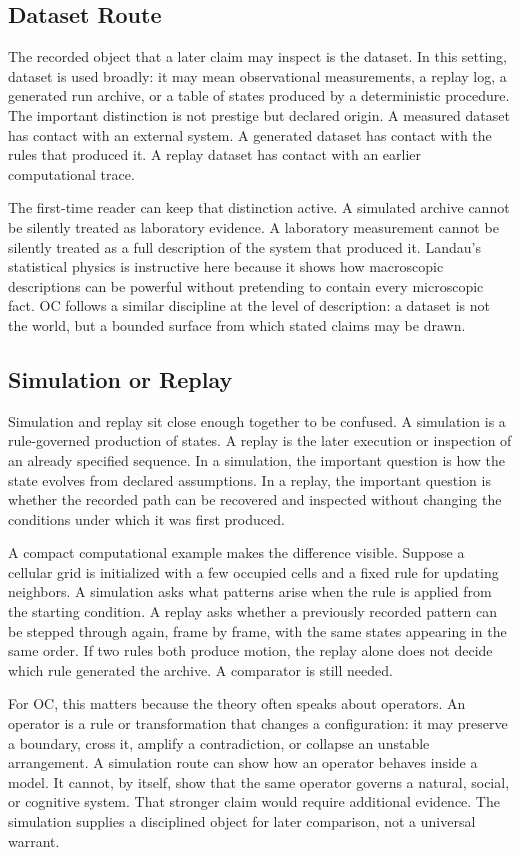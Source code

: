\documentclass[11pt,a4paper,openany]{book}
\begin{document}
\subsection{Dataset Route}
The recorded object that a later claim may inspect is the dataset. In this setting, dataset is used broadly: it may mean observational measurements, a replay log, a generated run archive, or a table of states produced by a deterministic procedure. The important distinction is not prestige but declared origin. A measured dataset has contact with an external system. A generated dataset has contact with the rules that produced it. A replay dataset has contact with an earlier computational trace. \cite{wilson_renormalization,landau_stat_physics}\par
The first-time reader can keep that distinction active. A simulated archive cannot be silently treated as laboratory evidence. A laboratory measurement cannot be silently treated as a full description of the system that produced it. Landau's statistical physics is instructive here because it shows how macroscopic descriptions can be powerful without pretending to contain every microscopic fact. OC follows a similar discipline at the level of description: a dataset is not the world, but a bounded surface from which stated claims may be drawn.\par
\subsection{Simulation or Replay}
Simulation and replay sit close enough together to be confused. A simulation is a rule-governed production of states. A replay is the later execution or inspection of an already specified sequence. In a simulation, the important question is how the state evolves from declared assumptions. In a replay, the important question is whether the recorded path can be recovered and inspected without changing the conditions under which it was first produced. \cite{wilson_renormalization,landau_stat_physics}\par
A compact computational example makes the difference visible. Suppose a cellular grid is initialized with a few occupied cells and a fixed rule for updating neighbors. A simulation asks what patterns arise when the rule is applied from the starting condition. A replay asks whether a previously recorded pattern can be stepped through again, frame by frame, with the same states appearing in the same order. If two rules both produce motion, the replay alone does not decide which rule generated the archive. A comparator is still needed.\par
For OC, this matters because the theory often speaks about operators. An operator is a rule or transformation that changes a configuration: it may preserve a boundary, cross it, amplify a contradiction, or collapse an unstable arrangement. A simulation route can show how an operator behaves inside a model. It cannot, by itself, show that the same operator governs a natural, social, or cognitive system. That stronger claim would require additional evidence. The simulation supplies a disciplined object for later comparison, not a universal warrant.\par
\end{document}
